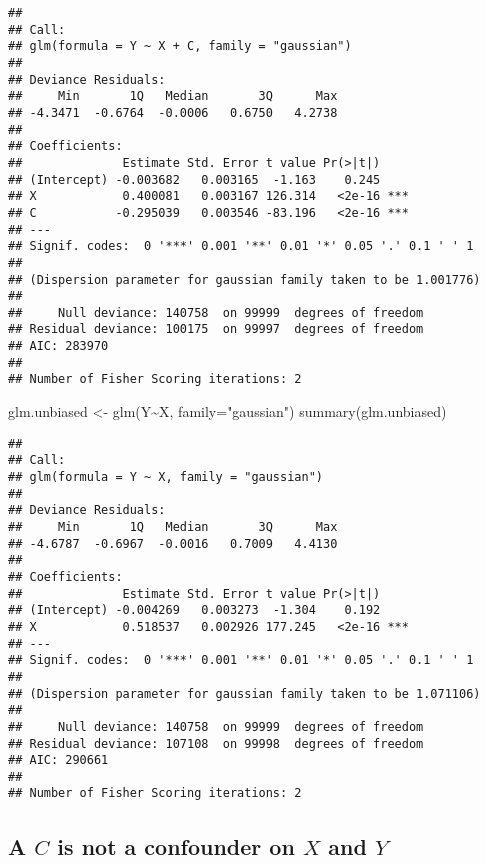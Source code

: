 \documentclass[
]{book}
\newenvironment{Shaded}{\begin{snugshade}}{\end{snugshade}}
\newcommand{\AttributeTok}[1]{\textcolor[rgb]{0.77,0.63,0.00}{#1}}
\newcommand{\FunctionTok}[1]{\textcolor[rgb]{0.00,0.00,0.00}{#1}}
\newcommand{\NormalTok}[1]{#1}
\newcommand{\OtherTok}[1]{\textcolor[rgb]{0.56,0.35,0.01}{#1}}
\newcommand{\SpecialCharTok}[1]{\textcolor[rgb]{0.00,0.00,0.00}{#1}}
\newcommand{\StringTok}[1]{\textcolor[rgb]{0.31,0.60,0.02}{#1}}
\begin{document}
\begin{verbatim}
## 
## Call:
## glm(formula = Y ~ X + C, family = "gaussian")
## 
## Deviance Residuals: 
##     Min       1Q   Median       3Q      Max  
## -4.3471  -0.6764  -0.0006   0.6750   4.2738  
## 
## Coefficients:
##              Estimate Std. Error t value Pr(>|t|)    
## (Intercept) -0.003682   0.003165  -1.163    0.245    
## X            0.400081   0.003167 126.314   <2e-16 ***
## C           -0.295039   0.003546 -83.196   <2e-16 ***
## ---
## Signif. codes:  0 '***' 0.001 '**' 0.01 '*' 0.05 '.' 0.1 ' ' 1
## 
## (Dispersion parameter for gaussian family taken to be 1.001776)
## 
##     Null deviance: 140758  on 99999  degrees of freedom
## Residual deviance: 100175  on 99997  degrees of freedom
## AIC: 283970
## 
## Number of Fisher Scoring iterations: 2
\end{verbatim}

\begin{Shaded}
\begin{Highlighting}[]
\NormalTok{glm.unbiased }\OtherTok{\textless{}{-}} \FunctionTok{glm}\NormalTok{(Y}\SpecialCharTok{\textasciitilde{}}\NormalTok{X, }\AttributeTok{family=}\StringTok{"gaussian"}\NormalTok{)}
\FunctionTok{summary}\NormalTok{(glm.unbiased)}
\end{Highlighting}
\end{Shaded}

\begin{verbatim}
## 
## Call:
## glm(formula = Y ~ X, family = "gaussian")
## 
## Deviance Residuals: 
##     Min       1Q   Median       3Q      Max  
## -4.6787  -0.6967  -0.0016   0.7009   4.4130  
## 
## Coefficients:
##              Estimate Std. Error t value Pr(>|t|)    
## (Intercept) -0.004269   0.003273  -1.304    0.192    
## X            0.518537   0.002926 177.245   <2e-16 ***
## ---
## Signif. codes:  0 '***' 0.001 '**' 0.01 '*' 0.05 '.' 0.1 ' ' 1
## 
## (Dispersion parameter for gaussian family taken to be 1.071106)
## 
##     Null deviance: 140758  on 99999  degrees of freedom
## Residual deviance: 107108  on 99998  degrees of freedom
## AIC: 290661
## 
## Number of Fisher Scoring iterations: 2
\end{verbatim}

\hypertarget{a-c-is-not-a-confounder-on-x-and-y}{%
\subsection{\texorpdfstring{A \(C\) is not a confounder on \(X\) and \(Y\)}{A C is not a confounder on X and Y}}\label{a-c-is-not-a-confounder-on-x-and-y}}
\end{document}
